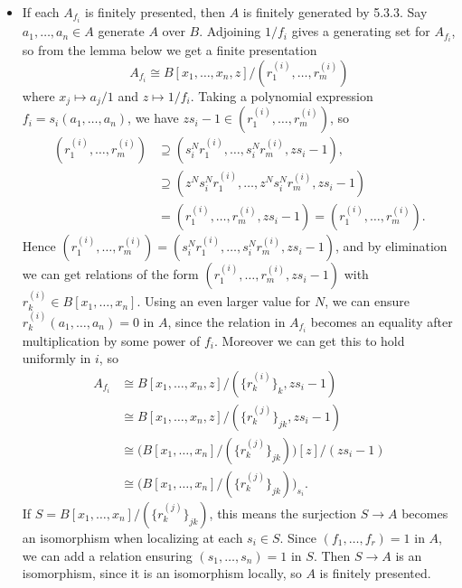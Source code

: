 \documentclass{report}
\begin{document}
\begin{enumerate}[label=\textbf{7.3.\Alph*.}]
\begin{itemize}
		      \item If each $A_{f_i}$ is finitely presented, then $A$ is
		            finitely generated by 5.3.3. Say $a_1,\ldots,a_n\in A$
		            generate $A$ over $B$. Adjoining $1/f_i$ gives a generating
		            set for $A_{f_i}$, so from the lemma below we get a finite
		            presentation
		            \begin{equation*}
			            A_{f_i} \cong
			            B[x_1,\ldots,x_n,z]/(r^{(i)}_1,\ldots,r^{(i)}_m)
		            \end{equation*}
		            where $x_j\mapsto a_j/1$ and $z\mapsto 1/f_i$. Taking a
		            polynomial expression $f_i=s_i(a_1,\ldots,a_n)$, we have
		            $zs_i-1\in(r^{(i)}_1,\ldots,r^{(i)}_m)$, so
		            \begin{align*}
			            (r^{(i)}_1,\ldots,r^{(i)}_m)
			             & \supseteq (s_i^Nr^{(i)}_1,\ldots,s_i^Nr^{(i)}_m,zs_i-1),              \\
			             & \supseteq (z^Ns_i^Nr^{(i)}_1,\ldots,z^Ns_i^Nr^{(i)}_m,zs_i-1)         \\
			             & = (r^{(i)}_1,\ldots,r^{(i)}_m,zs_i-1) = (r^{(i)}_1,\ldots,r^{(i)}_m).
		            \end{align*}
		            Hence $(r^{(i)}_1,\ldots,r^{(i)}_m)=(s_i^Nr^{(i)}_1,\ldots,s_i^Nr^{(i)}_m,zs_i-1)$,
		            and by elimination we can get relations of the form
		            $(r^{(i)}_1,\ldots,r^{(i)}_m,zs_i-1)$ with
		            $r^{(i)}_k\in B[x_1,\ldots,x_n]$. Using an even larger value
		            for $N$, we can ensure $r^{(i)}_k(a_1,\ldots,a_n)=0$ in $A$,
		            since the relation in $A_{f_i}$ becomes an equality after
		            multiplication by some power of $f_i$. Moreover we can get
		            this to hold uniformly in $i$, so
		            \begin{align*}
			            A_{f_i}
			             & \cong B[x_1,\ldots,x_n,z]/(\{r^{(i)}_k\}_k,zs_i-1)                   \\
			             & \cong B[x_1,\ldots,x_n,z]/(\{r^{(j)}_k\}_{jk},zs_i-1)                \\
			             & \cong \bigl(B[x_1,\ldots,x_n]/(\{r^{(j)}_k\}_{jk})\bigr)[z]/(zs_i-1) \\
			             & \cong \bigl(B[x_1,\ldots,x_n]/(\{r^{(j)}_k\}_{jk})\bigr)_{s_i}.
		            \end{align*}
		            If $S=B[x_1,\ldots,x_n]/(\{r^{(j)}_k\}_{jk})$, this means
		            the surjection $S\to A$ becomes an isomorphism when localizing
		            at each $s_i\in S$. Since $(f_1,\ldots,f_r)=1$ in $A$, we
		            can add a relation ensuring $(s_1,\ldots,s_n)=1$ in $S$.
		            Then $S\to A$ is an isomorphism, since it is an isomorphism
		            locally, so $A$ is finitely presented.
	      \end{itemize}


\end{enumerate}
\end{document}
